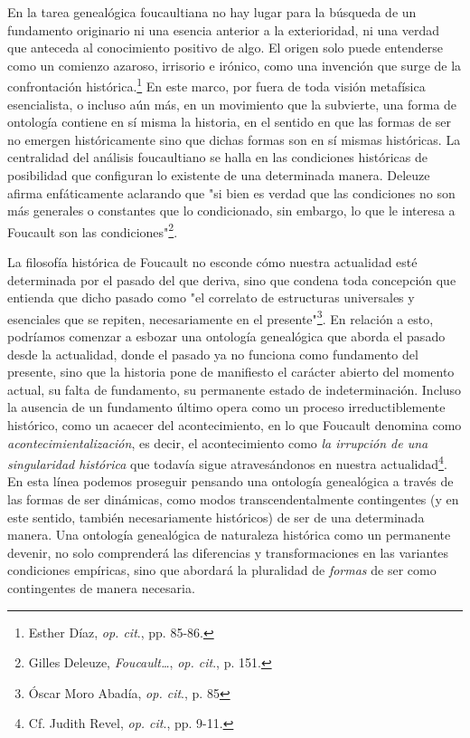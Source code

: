 En la tarea genealógica foucaultiana no hay lugar para la búsqueda de un
fundamento originario ni una esencia anterior a la exterioridad, ni una
verdad que anteceda al conocimiento positivo de algo. El origen solo
puede entenderse como un comienzo azaroso, irrisorio e irónico, como una
invención que surge de la confrontación histórica.\footnote{Esther Díaz,
  \emph{op. cit}., pp. 85-86.} En este marco, por fuera de toda visión
metafísica esencialista, o incluso aún más, en un movimiento que la
subvierte, una forma de ontología contiene en sí misma la historia, en
el sentido en que las formas de ser no emergen históricamente sino que
dichas formas son en sí mismas históricas. La centralidad del análisis
foucaultiano se halla en las condiciones históricas de posibilidad que
configuran lo existente de una determinada manera. Deleuze afirma
enfáticamente aclarando que "si bien es verdad que las condiciones no
son más generales o constantes que lo condicionado, sin embargo, lo que
le interesa a Foucault son las condiciones"\footnote{Gilles Deleuze,
  \emph{Foucault\ldots{}}, \emph{op. cit}., p. 151.}.

La filosofía histórica de Foucault no esconde cómo nuestra actualidad
esté determinada por el pasado del que deriva, sino que condena toda
concepción que entienda que dicho pasado como "el correlato de
estructuras universales y esenciales que se repiten, necesariamente en
el presente"\footnote{Óscar Moro Abadía, \emph{op. cit}., p. 85}. En
relación a esto, podríamos comenzar a esbozar una ontología genealógica
que aborda el pasado desde la actualidad, donde el pasado ya no funciona
como fundamento del presente, sino que la historia pone de manifiesto el
carácter abierto del momento actual, su falta de fundamento, su
permanente estado de indeterminación. Incluso la ausencia de un
fundamento último opera como un proceso irreductiblemente histórico,
como un acaecer del acontecimiento, en lo que Foucault denomina como
\emph{acontecimientalización}, es decir, el acontecimiento como \emph{la
irrupción de una singularidad histórica} que todavía sigue
atravesándonos en nuestra actualidad\footnote{Cf. Judith Revel,
  \emph{op. cit}., pp. 9-11.}. En esta línea podemos proseguir pensando
una ontología genealógica a través de las formas de ser dinámicas, como
modos transcendentalmente contingentes (y en este sentido, también
necesariamente históricos) de ser de una determinada manera. Una
ontología genealógica de naturaleza histórica como un permanente
devenir, no solo comprenderá las diferencias y transformaciones en las
variantes condiciones empíricas, sino que abordará la pluralidad de
\emph{formas} de ser como contingentes de manera necesaria.

